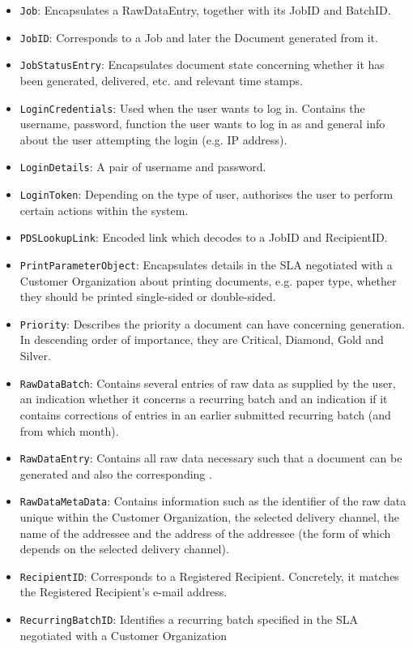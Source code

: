 \begin{itemize}
	\item \texttt{Job}: Encapsulates a RawDataEntry, together with its JobID and BatchID.
	\item \texttt{JobID}: Corresponds to a Job and later the Document generated from it.
	\item \texttt{JobStatusEntry}: Encapsulates document state concerning whether it has been generated, delivered, etc. and relevant time stamps.
    \item \texttt{LoginCredentials}: Used when the user wants to log in. Contains the username, password, function the user wants to log in as and general info about the user attempting the login (e.g. IP address).
	\item \texttt{LoginDetails}: A pair of username and password.
    \item \texttt{LoginToken}: Depending on the type of user, authorises the user to perform certain actions within the system.
    \item \texttt{PDSLookupLink}: Encoded link which decodes to a JobID and RecipientID.
	\item \texttt{PrintParameterObject}: Encapsulates details in the SLA negotiated with a Customer Organization about printing documents, e.g. paper type, whether they should be printed single-sided or double-sided.
	\item \texttt{Priority}: Describes the priority a document can have concerning generation. In descending order of importance, they are Critical, Diamond, Gold and Silver.
    \item \texttt{RawDataBatch}: Contains several entries of raw data as supplied by the user, an indication whether it concerns a recurring batch and an indication if it contains corrections of entries in an earlier submitted recurring batch (and from which month). 
    \item \texttt{RawDataEntry}: Contains all raw data necessary such that a document can be generated and also the corresponding .
    \item \texttt{RawDataMetaData}: Contains information such as the identifier of the raw data unique within the Customer Organization, the selected delivery channel, the name of the addressee and the address of the addressee (the form of which depends on the selected delivery channel).
    \item \texttt{RecipientID}: Corresponds to a Registered Recipient. Concretely, it matches the Registered Recipient's e-mail address.
	\item \texttt{RecurringBatchID}: Identifies a recurring batch specified in the SLA negotiated with a Customer Organization

\end{itemize}
